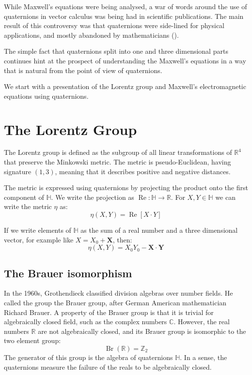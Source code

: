 \documentclass{article}
\newcommand{\HH}{\mathbb{H}}
\newcommand{\CC}{\mathbb{C}}
\newcommand{\RR}{\mathbb{R}}
\newcommand{\ZZ}{\mathbb{Z}}
\renewcommand{\Re}{\operatorname{Re}}
\newcommand{\Br}{\operatorname{Br}}
\begin{document}
While Maxwell's equations were being analysed, a war of words around the use of quaternions in vector calculus was being had in scientific publications.
The main result of this controversy was that quaternions were side-lined for physical applications, and mostly abandoned by mathematicians (\cite{vector}).

The simple fact that quaternions split into one and three dimensional parts continues hint at the prospect of understanding the Maxwell's equations in a way that is natural from the point of view of quaternions.

We start with a presentation of the Lorentz group and Maxwell's electromagnetic equations using quaternions.


\section{The Lorentz Group}

The Lorentz group is defined as the subgroup of all linear transformations of $\RR^4$ that preserve the Minkowski metric.
The metric is pseudo-Euclidean, having signature $(1,3)$, meaning that it describes positive and negative distances.

The metric is expressed using quaternions by projecting the product onto the first component of $\HH$. We write the projection as $\Re:\HH \to \RR$.
For $X,Y \in \HH$ we can write the metric $\eta$ as:
$$ \eta(X,Y) = \Re[X\cdot Y]$$

If we write elements of $\HH$ as the sum of a real number and a three dimensional vector, for example like $X = X_0 + \mathbf{X}$, then:
$$ \eta(X,Y) = X_0Y_0 - \mathbf{X}\cdot \mathbf{Y} $$

\subsection{The Brauer isomorphism}

In the 1960s, Grothendieck classified division algebras over number fields.
He called the group the Brauer group, after German American mathematician Richard Brauer.
A property of the Brauer group is that it is trivial for algebraically closed field, such as the complex numbers $\CC$.
However, the real numbers $\RR$ are not algebraically closed, and its Brauer group is isomorphic to the two element group:
$$\Br(\RR)=\ZZ_2$$
The generator of this group is the algebra of quaternions $\HH$.
In a sense, the quaternions measure the failure of the reals to be algebraically closed.
\end{document}
